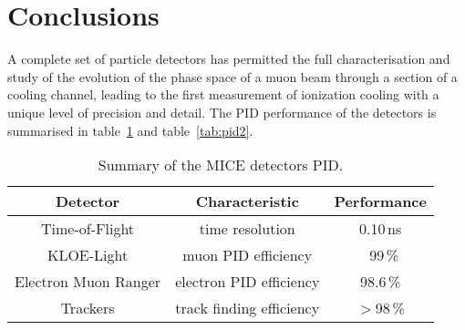 \graphicspath{{80-Conclusions/Figures/}}

\section{Conclusions}
\label{Sect:Conclusions}

A complete set of particle detectors has permitted the full characterisation and study of the evolution of the phase space of a muon beam through a section of a cooling channel, leading to the first measurement of ionization cooling with a unique level of precision and detail.
The PID performance of the detectors is summarised in table~\ref{tab:pid1} and table~\ref{tab:pid2}.

\begin{table}[htb!]
	\centering
	\begin{tabular}{c|c|c}
	  \textbf{Detector}              & \textbf{Characteristic}            & \textbf{Performance} \\
		\hline
    Time-of-Flight        & time resolution           & 0.10\,ns    \\
    KLOE-Light            & muon PID efficiency       & ~99\,\%       \\
    Electron Muon Ranger  & electron PID efficiency   & 98.6\,\%      \\
    Trackers              & track finding efficiency  & $>$98\,\%     \\
  \end{tabular}
	\caption{Summary of the MICE detectors PID.}
	\label{tab:pid1}
\end{table}


